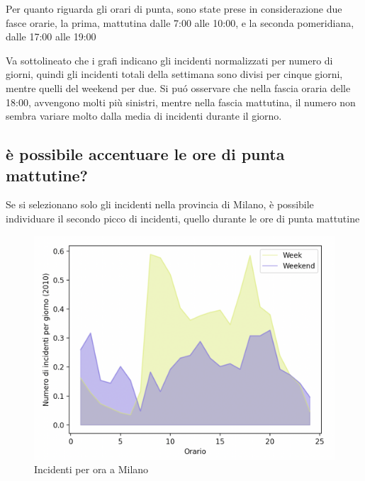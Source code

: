 \documentclass[a4paper]{report}
\begin{document}
Per quanto riguarda gli orari di punta, 
sono state prese in considerazione due fasce orarie, la prima, 
mattutina dalle 7:00 alle 10:00, e la seconda pomeridiana, 
dalle 17:00 alle 19:00

%


Va sottolineato che i grafi indicano gli incidenti normalizzati per numero di 
giorni, 
quindi gli incidenti totali della settimana sono divisi per cinque giorni, 
mentre quelli del weekend per due.
Si pu\'o osservare che nella fascia oraria delle 18:00, 
avvengono molti più sinistri, mentre nella fascia mattutina, 
il numero non sembra variare molto dalla media di incidenti durante il giorno.

\subsection{è possibile accentuare le ore di punta mattutine?}

Se si selezionano solo gli incidenti nella provincia di Milano, è possibile individuare 
il secondo picco di incidenti, quello durante le ore di punta mattutine

\begin{figure}
    \includegraphics[width=\linewidth]{../src/incidenti/incidenti_senza_coords/ore_punta/week_weekend_milano.png}
    \caption{Incidenti per ora a Milano}
    \label{fig:week_weekend_milano}
\end{figure}
\end{document}
